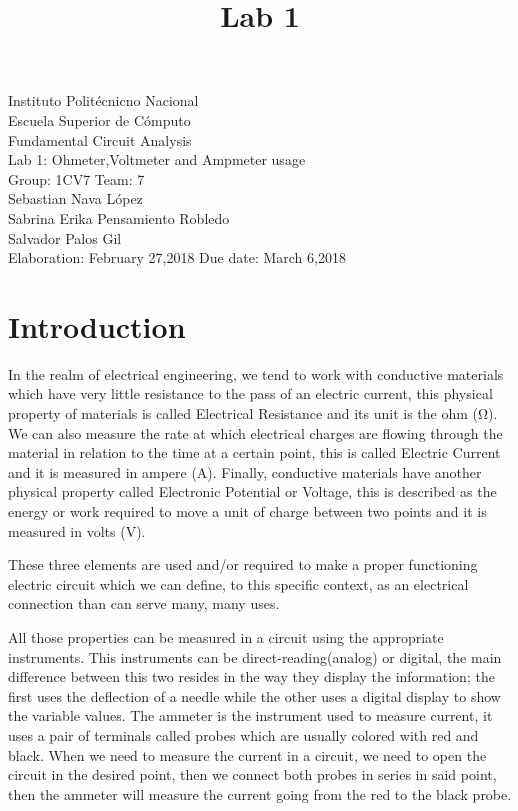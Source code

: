 \documentclass[a4paper]{article}
\title{Lab 1}
\begin{document}
\begin{titlepage}
    \centering
    {\Huge Instituto Politécnicno Nacional}\\[3ex]
    {\huge Escuela Superior de Cómputo}\\[8ex]
    {\huge Fundamental Circuit Analysis}\\[12ex]
    {\Large Lab 1: Ohmeter,Voltmeter and Ampmeter usage}\\[20ex]
    {\Large Group: 1CV7 Team: 7 \\[8ex]
    Sebastian Nava López\\[4ex]
    Sabrina Erika Pensamiento Robledo\\[4ex]
    Salvador Palos Gil\\[18ex]
    }
    \large{Elaboration: February 27,2018\hspace{8em} Due date: March 6,2018}
    

\end{titlepage}
\tableofcontents
\newpage
\section{Introduction}
In the realm of electrical engineering, we tend to work with conductive materials which have very little resistance to the pass of an electric current, this physical property of materials is called Electrical Resistance and its unit is the ohm (\si{\ohm}). We can also measure the rate at which electrical charges are flowing through the material in relation to the time at a certain point, this is called Electric Current and it is measured in ampere (A). Finally, conductive materials have another physical property called Electronic Potential or Voltage, this is described as the energy or work required to move a unit of charge between two points and it is measured in volts (V). 

These three elements are used and/or required to make a proper functioning electric circuit which we can define, to this specific context, as an electrical connection than can serve many, many uses.

All those properties can be measured in a circuit using the appropriate instruments. This instruments can be direct-reading(analog) or digital, the main difference between this two resides in the way they display the information; the first uses the deflection of a needle while the other uses a digital display to show the variable values. The ammeter is the instrument used to measure current, it uses a pair of terminals called probes which are usually colored with red and black. When we need to measure the current in a circuit, we need to open the circuit in the desired point, then we connect both probes in series in said point, then the ammeter will measure the current going from the red to the black probe. 
\end{document}

